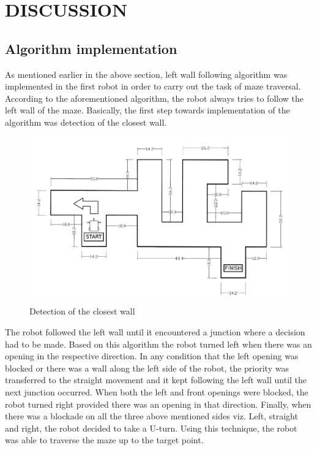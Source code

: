 \section{DISCUSSION}
\subsection{Algorithm implementation}
As mentioned earlier in the above section, left wall following algorithm was implemented in the first robot in order to carry out the task of maze traversal. 
According to the aforementioned algorithm, the robot always tries to follow the left wall of the maze. Basically, the first step towards implementation of the algorithm was detection of the closest wall. \\
\begin{figure}[h]
\center
\includegraphics[scale=0.3]{part1_newnew.jpg}
\caption{Detection of the closest wall} 
\label{Firstplacementofthebot}
\end{figure}
\justify The robot followed the left wall until it encountered a junction where a decision had to be made. Based on this algorithm the robot turned left when there was an opening in the respective direction. In any condition that the left opening was blocked or there was a wall along the left side of the robot, the priority was transferred to the straight movement and it kept following the left wall until the next junction occurred. When both the left and front openings were blocked, the robot turned right provided there was an opening in that direction. Finally, when there was a blockade on all the three above mentioned sides viz. Left, straight and right, the robot decided to take a U-turn. 
Using this technique, the robot was able to traverse the maze up to the target point.\\
